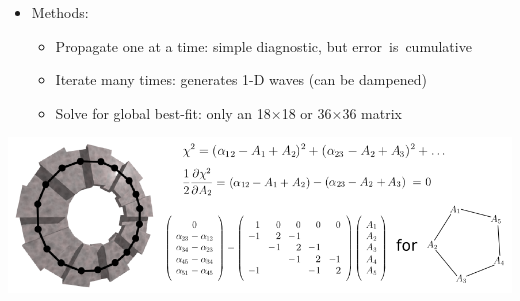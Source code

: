 \documentclass[compress]{beamer}
\begin{document}
\begin{frame}
\begin{itemize}
\item Methods:
\begin{itemize}
\item Propagate one at a time: simple diagnostic, but \mbox{error is cumulative\hspace{-1 cm}}
\item Iterate many times: generates 1-D waves (can be dampened)
\item Solve for global best-fit: only an 18$\times$18 or 36$\times$36 matrix
\end{itemize}
\end{itemize}

\includegraphics[width=\linewidth]{matrix_description_onestation.png}
\end{frame}

\end{document}
